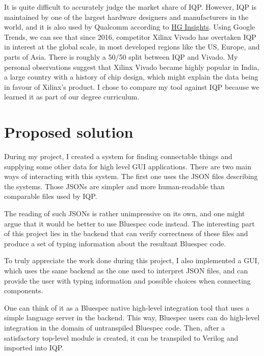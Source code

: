 \documentclass[12pt]{report}
\begin{document}
\begin{tcolorbox}[title=Market share and justification for focusing entirely on comparisons with Intel Quartus Prime]
   It is quite difficult to accurately judge the market share of IQP. However, IQP is maintained by one of the largest hardware designers and manufacturers in the world, and it is also used by Qualcomm according to \href{https://discovery.hgdata.com/product/intel-quartus-prime}{HG Insights}. Using Google Trends, we can see that since 2016, competitor Xilinx Vivado has overtaken IQP in interest at the global scale, in most developed regions like the US, Europe, and parts of Asia. There is roughly a 50/50 split between IQP and Vivado. My personal observations suggest that Xilinx Vivado became highly popular in India, a large country with a history of chip design, which might explain the data being in favour of Xilinx's product. I chose to compare my tool against IQP because we learned it as part of our degree curriculum.
\end{tcolorbox}

\section{Proposed solution}
During my project, I created a system for finding connectable things and supplying some other data for high level GUI applications. There are two main ways of interacting with this system. The first one uses the JSON files describing the systems. Those JSONs are simpler and more human-readable than comparable files used by IQP. 

The reading of such JSONs is rather unimpressive on its own, and one might argue that it would be better to use Bluespec code instead. The interesting part of this project lies in the backend that can verify correctness of these files and produce a set of typing information about the resultant Bluespec code.  

To truly appreciate the work done during this project, I also implemented a GUI, which uses the same backend as the one used to interpret JSON files, and can provide the user with typing information and possible choices when connecting components.  

One can think of it as a Bluespec native high-level integration tool that uses a simple language server in the backend. This way, Bluespec users can do high-level integration in the domain of untranspiled Bluespec code. Then, after a satisfactory top-level module is created, it can be transpiled to Verilog and imported into IQP. 
\end{document}

